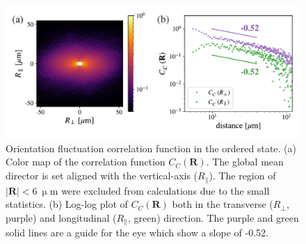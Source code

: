 \documentclass[%
 reprint,
 amsmath,amssymb,
 aps,
 floatfix
]{revtex4-2}
\newcommand{\mum}{\upmu\textrm{m}}
\begin{document}
\begin{figure}[t!]
\includegraphics[width=\columnwidth]{fluc_corr.pdf}
\caption{\label{fluc_corr} Orientation fluctuation correlation function in the ordered state. 
(a) Color map of the correlation function $C_C\left(\bm{R}\right)$. 
The global mean director is set aligned with the vertical-axis ($R_\parallel$).
The region of $|\bm{R}|<6\ \mum$ were excluded from calculations due to the small statistics.
(b) Log-log plot of $C_C\left(\bm{R}\right)$ both in the transverse ($R_\perp$, purple) and longitudinal ($R_\parallel$, green) direction.
The purple and green solid lines are a guide for the eye which show a slope of -0.52.
}
\end{figure}
\end{document}
